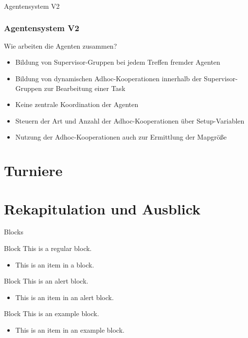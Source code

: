 \documentclass[aspectratio=169]{beamer} %
\begin{document}
\begin{frame}{Agentensystem V2}
	\frametitle{Agentensystem V2}
	\begin{block}{Wie arbeiten die Agenten zusammen?}
	\end{block}
	\textbf{ }
	\begin{itemize}
		\setlength\itemsep{5mm}
		\item Bildung von Supervisor-Gruppen bei jedem Treffen fremder Agenten		
		\item Bildung von dynamischen Adhoc-Kooperationen innerhalb der Supervisor-Gruppen zur Bearbeitung einer Task
		\item Keine zentrale Koordination der Agenten
		\item Steuern der Art und Anzahl der Adhoc-Kooperationen über Setup-Variablen
		\item Nutzung der Adhoc-Kooperationen auch zur Ermittlung der Mapgröße
	\end{itemize}
\end{frame}

\section{Turniere}

\section{Rekapitulation und Ausblick}

\begin{frame}{Blocks}
    \begin{block}{Block}
        This is a regular block.
        \begin{itemize}
            \item This is an item in a block.
        \end{itemize}
    \end{block}
    
    \begin{alertblock}{Block}
        This is an alert block.
        \begin{itemize}
            \item This is an item in an alert block.
        \end{itemize}
    \end{alertblock}
    
    \begin{exampleblock}{Block}
        This is an example block.
        \begin{itemize}
            \item This is an item in an example block.
        \end{itemize}
    \end{exampleblock}
\end{frame}
\end{document}
